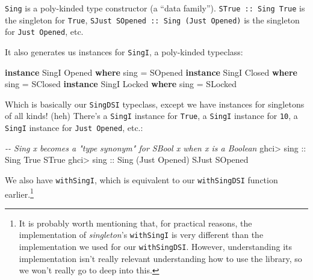 \documentclass[]{article}
\newenvironment{Shaded}{}{}
\newcommand{\CommentTok}[1]{\textcolor[rgb]{0.38,0.63,0.69}{\textit{#1}}}
\newcommand{\DataTypeTok}[1]{\textcolor[rgb]{0.56,0.13,0.00}{#1}}
\newcommand{\KeywordTok}[1]{\textcolor[rgb]{0.00,0.44,0.13}{\textbf{#1}}}
\newcommand{\NormalTok}[1]{#1}
\newcommand{\OperatorTok}[1]{\textcolor[rgb]{0.40,0.40,0.40}{#1}}
\newcommand{\OtherTok}[1]{\textcolor[rgb]{0.00,0.44,0.13}{#1}}
\begin{document}
\texttt{Sing} is a poly-kinded type constructor (a ``data family'').
\texttt{STrue\ ::\ Sing\ \textquotesingle{}True} is the singleton for
\texttt{\textquotesingle{}True},
\texttt{SJust\ SOpened\ ::\ Sing\ (\textquotesingle{}Just\ \textquotesingle{}Opened)}
is the singleton for \texttt{\textquotesingle{}Just\ \textquotesingle{}Opened},
etc.

It also generates us instances for \texttt{SingI}, a poly-kinded typeclass:

\begin{Shaded}
\begin{Highlighting}[]
\KeywordTok{instance} \DataTypeTok{SingI} \DataTypeTok{\textquotesingle{}Opened} \KeywordTok{where}
\NormalTok{    sing }\OtherTok{=} \DataTypeTok{SOpened}
\KeywordTok{instance} \DataTypeTok{SingI} \DataTypeTok{\textquotesingle{}Closed} \KeywordTok{where}
\NormalTok{    sing }\OtherTok{=} \DataTypeTok{SClosed}
\KeywordTok{instance} \DataTypeTok{SingI} \DataTypeTok{\textquotesingle{}Locked} \KeywordTok{where}
\NormalTok{    sing }\OtherTok{=} \DataTypeTok{SLocked}
\end{Highlighting}
\end{Shaded}

Which is basically our \texttt{SingDSI} typeclass, except we have instances for
singletons of all kinds! (heh) There's a \texttt{SingI} instance for
\texttt{\textquotesingle{}True}, a \texttt{SingI} instance for \texttt{10}, a
\texttt{SingI} instance for
\texttt{\textquotesingle{}Just\ \textquotesingle{}Opened}, etc.:

\begin{Shaded}
\begin{Highlighting}[]
\CommentTok{{-}{-} Sing x becomes a "type synonym" for SBool x when x is a Boolean}
\NormalTok{ghci}\OperatorTok{\textgreater{}}\OtherTok{ sing ::} \DataTypeTok{Sing} \DataTypeTok{\textquotesingle{}True}
\DataTypeTok{STrue}
\NormalTok{ghci}\OperatorTok{\textgreater{}}\OtherTok{ sing ::} \DataTypeTok{Sing}\NormalTok{ (}\DataTypeTok{\textquotesingle{}Just} \DataTypeTok{\textquotesingle{}Opened}\NormalTok{)}
\DataTypeTok{SJust} \DataTypeTok{SOpened}
\end{Highlighting}
\end{Shaded}

We also have \texttt{withSingI}, which is equivalent to our \texttt{withSingDSI}
function earlier.\footnote{It is probably worth mentioning that, for practical
  reasons, the implementation of \emph{singleton}'s \texttt{withSingI} is very
  different than the implementation we used for our \texttt{withSingDSI}.
  However, understanding its implementation isn't really relevant understanding
  how to use the library, so we won't really go to deep into this.}
\end{document}
